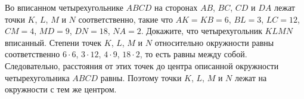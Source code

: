 \problem
Во вписанном четырехугольнике $ABCD$ на сторонах $AB$, $BC$, $CD$ и $DA$ лежат
точки $K$, $L$, $M$ и $N$ соответственно, такие что $AK = KB = 6$, $BL = 3$,
$LC = 12$, $CM = 4$, $MD = 9$, $DN = 18$, $NA = 2$.
Докажите, что четырехугольник $KLMN$ вписанный.
\solution
Степени точек $K$, $L$, $M$ и $N$ относительно окружности равны соответственно
$6 \cdot 6$, $3 \cdot 12$, $4 \cdot 9$, $18 \cdot 2$, то есть равны между
собой.
Следовательно, расстояния от этих точек до центра описанной окружности
четырехугольника $ABCD$ равны.
Поэтому точки $K$, $L$, $M$ и $N$ лежат на окружности с тем же центром.
\endproblem
